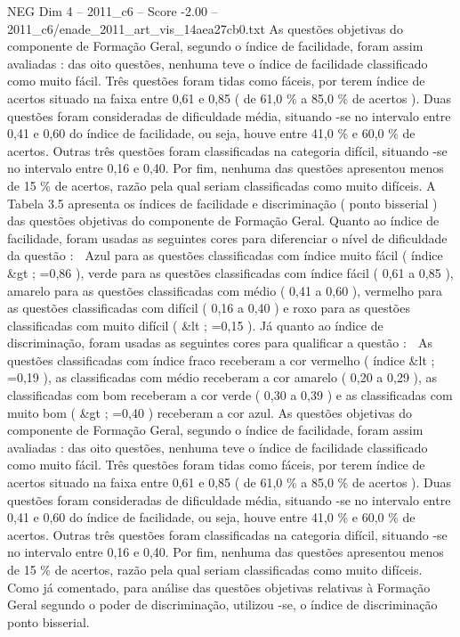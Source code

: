 \begin{textsample}{NEG Dim 4 – 2011\_c6 – Score -2.00 – 2011\_c6/enade\_2011\_art\_vis\_14aea27cb0.txt}
As questões objetivas do componente de Formação Geral, segundo o índice de facilidade, foram assim avaliadas : das oito questões, nenhuma teve o índice de facilidade classificado como muito fácil.
Três questões foram tidas como fáceis, por terem índice de acertos situado na faixa entre 0,61 e 0,85 ( de 61,0 \% a 85,0 \% de acertos ).
Duas questões foram consideradas de dificuldade média, situando -se no intervalo entre 0,41 e 0,60 do índice de facilidade, ou seja, houve entre 41,0 \% e 60,0 \% de acertos.
Outras três questões foram classificadas na categoria difícil, situando -se no intervalo entre 0,16 e 0,40.
Por fim, nenhuma das questões apresentou menos de 15 \% de acertos, razão pela qual seriam classificadas como muito difíceis.
A Tabela 3.5 apresenta os índices de facilidade e discriminação ( ponto bisserial ) das questões objetivas do componente de Formação Geral.
Quanto ao índice de facilidade, foram usadas as seguintes cores para diferenciar o nível de dificuldade da questão :  Azul para as questões classificadas com índice muito fácil ( índice \&gt ; =0,86 ), verde para as questões classificadas com índice fácil ( 0,61 a 0,85 ), amarelo para as questões classificadas com médio ( 0,41 a 0,60 ), vermelho para as questões classificadas com difícil ( 0,16 a 0,40 ) e roxo para as questões classificadas com muito difícil ( \&lt ; =0,15 ).
Já quanto ao índice de discriminação, foram usadas as seguintes cores para qualificar a questão :  As questões classificadas com índice fraco receberam a cor vermelho ( índice \&lt ; =0,19 ), as classificadas com médio receberam a cor amarelo ( 0,20 a 0,29 ), as classificadas com bom receberam a cor verde ( 0,30 a 0,39 ) e as classificadas com muito bom ( \&gt ; =0,40 ) receberam a cor azul.
As questões objetivas do componente de Formação Geral, segundo o índice de facilidade, foram assim avaliadas : das oito questões, nenhuma teve o índice de facilidade classificado como muito fácil.
Três questões foram tidas como fáceis, por terem índice de acertos situado na faixa entre 0,61 e 0,85 ( de 61,0 \% a 85,0 \% de acertos ).
Duas questões foram consideradas de dificuldade média, situando -se no intervalo entre 0,41 e 0,60 do índice de facilidade, ou seja, houve entre 41,0 \% e 60,0 \% de acertos.
Outras três questões foram classificadas na categoria difícil, situando -se no intervalo entre 0,16 e 0,40.
Por fim, nenhuma das questões apresentou menos de 15 \% de acertos, razão pela qual seriam classificadas como muito difíceis.
Como já comentado, para análise das questões objetivas relativas à Formação Geral segundo o poder de discriminação, utilizou -se, o índice de discriminação ponto bisserial.

\end{textsample}
